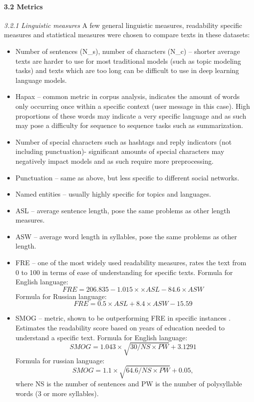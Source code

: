 \paragraph{3.2 Metrics} 
\textit{3.2.1 Linguistic measures} A few general linguistic measures, readability specific measures \cite{BlinovaTarasov} and statistical measures were chosen to compare texts in these datasets:
\begin{itemize}
	\item Number of sentences (N\_s), number of characters (N\_c) -- shorter average texts are harder to use for most traditional models (such as topic modeling tasks) and texts which are too long can be difficult to use in deep learning language models.
	
	\item Hapax \cite{FaltynekMatlach} -- common metric in corpus analysis, indicates the amount of words only occurring once within a specific context (user message in this case). High proportions of these words may indicate a very specific language and as such may pose a difficulty for sequence to sequence tasks such as summarization.
	
	\item Number of special characters such as hashtags and reply indicators (not including punctuation)- significant amounts of special characters may negatively impact models and as such require more preprocessing.
	
	\item Punctuation -- same as above, but less specific to different social networks.
	
	\item Named entities -- usually highly specific for topics and languages.
	
	\item ASL -- average sentence length, pose the same problems as other length measures.
	
	\item ASW -- average word length in syllables, pose the same problems as other length.
	
	\item FRE \cite{SiCallan} -- one of the most widely used readability measures, rates the text from 0 to 100 in terms of ease of understanding for specific texts. Formula for English language:
	\[
	\textit{FRE} = 206.835 - 1.015\times× \textit{ASL} - 84.6 \times \textit{ASW}
	\]
	Formula for Russian language:
	\[
	\textit{FRE} = 0.5 \times \textit{ASL} + 8.4 \times \textit{ASW} - 15.59
	\]
	\item SMOG -- metric, shown to be outperforming FRE in specific instances \cite{MeadeSmith}. Estimates the readability score based on years of education needed to understand a specific text. Formula for English language:
	\[
	\textit{SMOG} = 1.043 \times \sqrt{30 / \textit{NS} \times \textit{PW}} + 3.1291
	\]
	Formula for russian language:
	\[
	\textit{SMOG} = 1.1 \times \sqrt{64.6 / \textit{NS} \times \textit{PW}} + 0.05,
	\]
	where NS is the number of sentences and PW is the number of polysyllable words (3 or more syllables).
	

\end{itemize}
